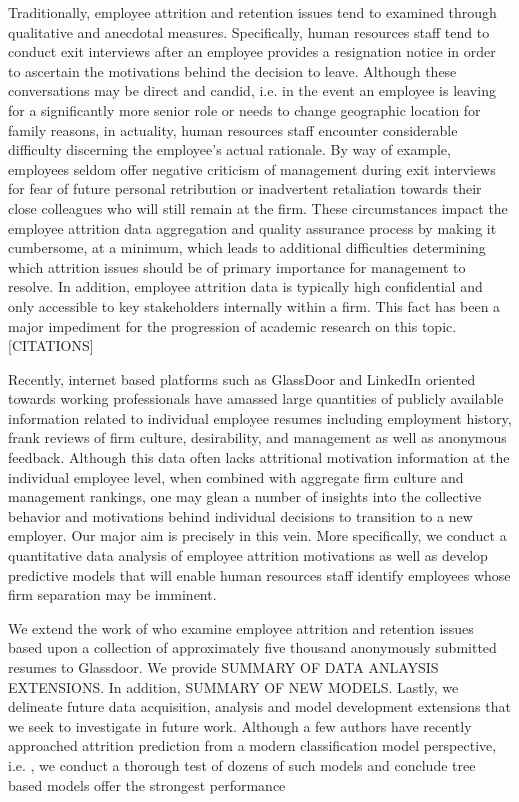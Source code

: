 \documentclass[10pt]{article}
\begin{document}
Traditionally, employee attrition and retention issues tend to examined through qualitative and anecdotal 
measures.  Specifically, human resources staff tend to conduct exit interviews after an employee provides 
a resignation notice in order to ascertain the motivations behind the decision to leave.  Although 
these conversations may be direct and candid, i.e. in the event an employee is leaving for a significantly 
more senior role or needs to change geographic location for family reasons, in actuality, human resources staff
encounter considerable difficulty discerning the employee's actual rationale.  By way of example, employees 
seldom offer negative criticism of management during exit interviews for fear of future personal retribution 
or inadvertent retaliation towards their close colleagues who will still remain at the firm.
These circumstances impact the employee attrition data aggregation and quality assurance process 
by making it cumbersome, at a minimum, which leads to additional difficulties determining which 
attrition issues should be of primary importance for management to resolve. In addition, employee 
attrition data is typically high confidential and only accessible to key stakeholders internally 
within a firm.  This fact has been a major impediment for the progression of academic research on 
this topic. [CITATIONS] 

Recently, internet based platforms such as GlassDoor and LinkedIn oriented towards working 
professionals have amassed large quantities of publicly available information related to individual 
employee resumes including employment history, frank reviews of firm culture, desirability, and management
as well as anonymous feedback.  Although this data often lacks attritional motivation information at 
the individual employee level, when combined with aggregate firm culture and management rankings, 
one may glean a number of insights into the collective behavior and motivations behind individual 
decisions to transition to a new employer. Our major aim is precisely in this vein.  More specifically, 
we conduct a quantitative data analysis of employee attrition motivations as well as develop 
predictive models that will enable human resources staff identify employees whose firm separation 
may be imminent.

We extend the work of \cite{Smart2016} who examine employee attrition and retention issues based upon 
a collection of approximately five thousand anonymously submitted resumes to Glassdoor.  We provide 
SUMMARY OF DATA ANLAYSIS EXTENSIONS.  In addition, SUMMARY OF NEW MODELS. Lastly, we delineate 
future data acquisition, analysis and model development extensions that we seek to investigate 
in future work. Although a few authors have recently approached attrition prediction 
from a modern classification model perspective, i.e. \cite{Fri2018}, we conduct a 
thorough test of dozens of such models and conclude tree based models offer the strongest performance
\end{document}
